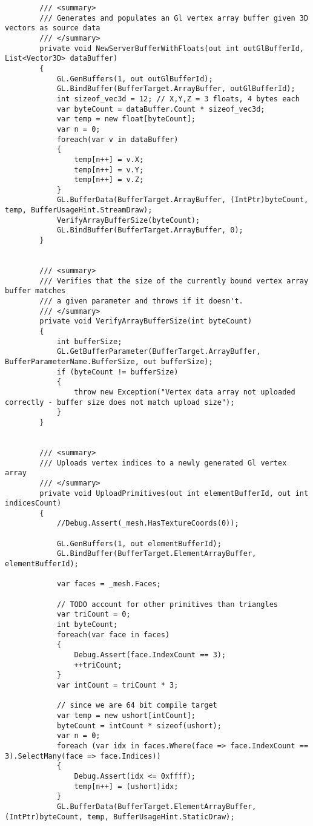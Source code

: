\begin{scriptsize}
\begin{verbatim}
        /// <summary>
        /// Generates and populates an Gl vertex array buffer given 3D vectors as source data
        /// </summary>
        private void NewServerBufferWithFloats(out int outGlBufferId, List<Vector3D> dataBuffer) 
        {
            GL.GenBuffers(1, out outGlBufferId);
            GL.BindBuffer(BufferTarget.ArrayBuffer, outGlBufferId);
            int sizeof_vec3d = 12; // X,Y,Z = 3 floats, 4 bytes each
            var byteCount = dataBuffer.Count * sizeof_vec3d;
            var temp = new float[byteCount];
            var n = 0;
            foreach(var v in dataBuffer)
            {
                temp[n++] = v.X;
                temp[n++] = v.Y;
                temp[n++] = v.Z;
            }
            GL.BufferData(BufferTarget.ArrayBuffer, (IntPtr)byteCount, temp, BufferUsageHint.StreamDraw);
            VerifyArrayBufferSize(byteCount);
            GL.BindBuffer(BufferTarget.ArrayBuffer, 0);
        }


        /// <summary>
        /// Verifies that the size of the currently bound vertex array buffer matches
        /// a given parameter and throws if it doesn't.
        /// </summary>
        private void VerifyArrayBufferSize(int byteCount)
        {
            int bufferSize;
            GL.GetBufferParameter(BufferTarget.ArrayBuffer, BufferParameterName.BufferSize, out bufferSize);
            if (byteCount != bufferSize)
            {
                throw new Exception("Vertex data array not uploaded correctly - buffer size does not match upload size");
            }
        }


        /// <summary>
        /// Uploads vertex indices to a newly generated Gl vertex array
        /// </summary>
        private void UploadPrimitives(out int elementBufferId, out int indicesCount)
        {
            //Debug.Assert(_mesh.HasTextureCoords(0));

            GL.GenBuffers(1, out elementBufferId);
            GL.BindBuffer(BufferTarget.ElementArrayBuffer, elementBufferId);

            var faces = _mesh.Faces;

            // TODO account for other primitives than triangles
            var triCount = 0;
            int byteCount;
            foreach(var face in faces)
            {
                Debug.Assert(face.IndexCount == 3);
                ++triCount;
            }
            var intCount = triCount * 3;

            // since we are 64 bit compile target
            var temp = new ushort[intCount];
            byteCount = intCount * sizeof(ushort);
            var n = 0;
            foreach (var idx in faces.Where(face => face.IndexCount == 3).SelectMany(face => face.Indices))
            {
                Debug.Assert(idx <= 0xffff);
                temp[n++] = (ushort)idx;
            }
            GL.BufferData(BufferTarget.ElementArrayBuffer, (IntPtr)byteCount, temp, BufferUsageHint.StaticDraw);



\end{verbatim}
\end{scriptsize}

